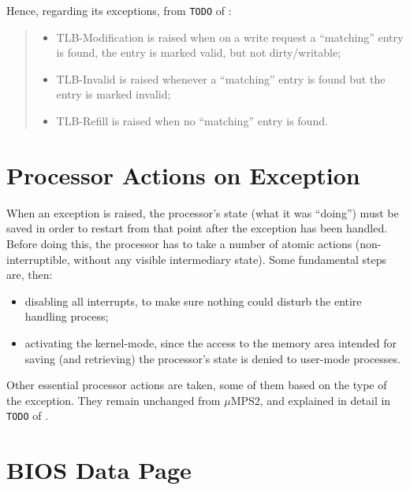 \documentclass[12pt,a4paper,openright,twoside]{report}
\begin{document}
Hence, regarding its exceptions, from \texttt{TODO} of \cite{pops}:
\begin{quote}
	\begin{itemize}
		\item TLB-Modification is raised when on a write request a ``matching'' entry is found, the entry is marked valid, but not dirty/writable;
		\item TLB-Invalid is raised whenever a ``matching'' entry is found but the entry is marked invalid;
		\item TLB-Refill is raised when no ``matching'' entry is found.
	\end{itemize}
\end{quote}

\section{Processor Actions on Exception}
\label{chap:processor_actions_on_exceptions}
When an exception is raised, the processor's state (what it was ``doing'') must be saved in order to restart from that point after the exception has been handled.
Before doing this, the processor has to take a number of atomic actions (non-interruptible, without any visible intermediary state).
Some fundamental steps are, then:
\begin{itemize}
	\item disabling all interrupts, to make sure nothing could disturb the entire handling process;
	\item activating the kernel-mode, since the access to the memory area intended for saving (and retrieving) the processor's state is denied to user-mode processes.
\end{itemize}

Other essential processor actions are taken, some of them based on the type of the exception.
They remain unchanged from $\mu$MPS2, and explained in detail in \texttt{TODO} of \cite{pops}.

\section{BIOS Data Page}
\label{chap:bios_data_page}
\end{document}

